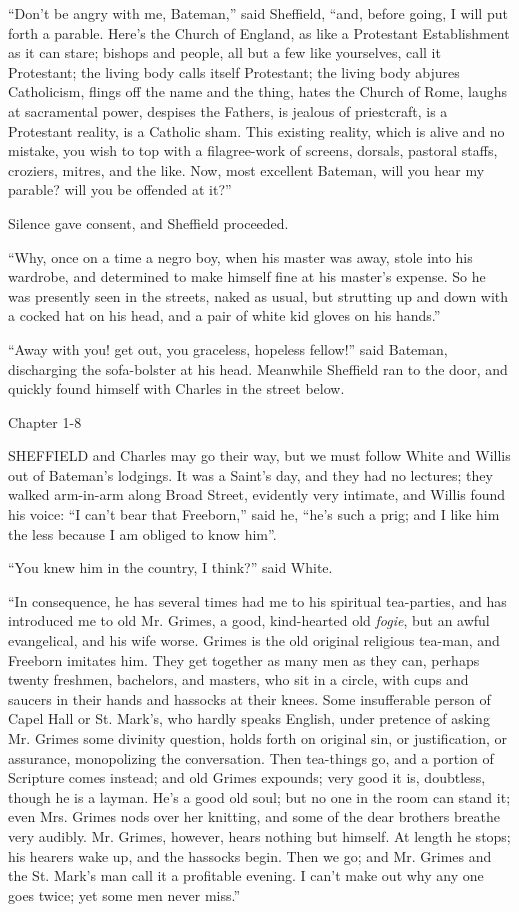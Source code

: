 ``Don't be angry with me, Bateman,'' said Sheffield,
``and, before going, I will put forth a parable. Here's the Church
of England, as like a Protestant Establishment as it can stare;
bishops and people, all but a few like yourselves, call it Protestant;
the living body calls itself Protestant; the living body abjures
Catholicism, flings off the name and the thing, hates the Church of
Rome, laughs at sacramental power, despises the Fathers, is jealous of
priestcraft, is a Protestant reality, is a Catholic sham. This
existing reality, which is alive and no mistake, you wish to top with
a filagree-work of screens, dorsals, pastoral staffs, croziers, mitres,
and the like. Now, most excellent Bateman, will you hear my parable?
will you be offended at it?''

Silence gave consent, and Sheffield proceeded.

``Why, once on a time a negro boy, when his master was away,
stole into his wardrobe, and determined to make himself fine at his
master's expense. So he was presently seen in the streets, naked as
usual, but strutting up and down with a cocked hat on his head, and a
pair of white kid gloves on his hands.''

``Away with you! get out, you graceless, hopeless fellow!'' said
Bateman, discharging the sofa-bolster at his head. Meanwhile Sheffield
ran to the door, and quickly found himself with Charles in the street
below.

Chapter 1-8


SHEFFIELD and Charles may go their way,
but we must follow White and Willis out of Bateman's lodgings. It was
a Saint's day, and they had no lectures; they walked arm-in-arm along
Broad Street, evidently very intimate, and Willis found his voice:
``I can't bear that Freeborn,'' said he, ``he's such a
prig; and I like him the less because I am obliged to know him''.

``You knew him in the country, I think?'' said White.

``In consequence, he has several times had me to his spiritual
tea-parties, and has introduced me to old Mr. Grimes, a good,
kind-hearted old \emph{fogie}, but an awful evangelical, and his wife
worse. Grimes is the old original religious tea-man, and Freeborn
imitates him. They get together as many men as they can, perhaps
twenty freshmen, bachelors, and masters, who sit in a circle, with
cups and saucers in their hands and hassocks at their knees. Some
insufferable person of Capel Hall or St. Mark's, who hardly speaks
English, under pretence of asking Mr. Grimes some divinity question,
holds forth on original sin, or justification, or assurance,
monopolizing the conversation. Then tea-things go, and a portion
of Scripture comes instead; and old Grimes expounds; very good it is,
doubtless, though he is a layman. He's a good old soul; but no one in
the room can stand it; even Mrs. Grimes nods over her knitting, and
some of the dear brothers breathe very audibly. Mr. Grimes, however,
hears nothing but himself. At length he stops; his hearers wake up,
and the hassocks begin. Then we go; and Mr. Grimes and the St. Mark's
man call it a profitable evening. I can't make out why any one goes
twice; yet some men never miss.''

